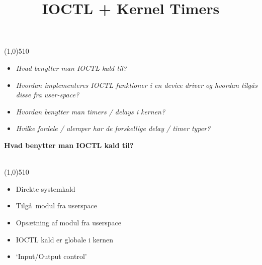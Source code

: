 \documentclass{paper}
\title{IOCTL + Kernel Timers}
\begin{document}
\maketitle
\line(1,0){510}
\begin{itemize}
\item \textit{Hvad benytter man IOCTL kald til?}
\item \textit{Hvordan implementeres IOCTL funktioner i en device driver og hvordan tilg\aa s disse fra user-space?}
\item \textit{Hvordan benytter man timers / delays i kernen?}
\item \textit{Hvilke fordele / ulemper har de forskellige delay / timer typer?\\}
\end{itemize}
\begin{large}\textbf{Hvad benytter man IOCTL kald til?}\end{large}\\
\line(1,0){510}
\begin{itemize}
\item Direkte systemkald
\item Tilg\aa\ modul fra userspace
\item Ops\ae tning af modul fra userspace
\item IOCTL kald er globale i kernen
\item `Input/Output control' \\
\end{itemize}
\end{document}
